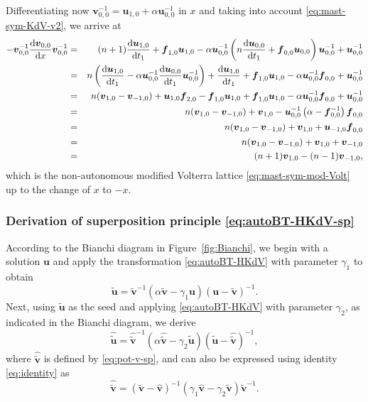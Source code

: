 \documentclass[dvips,10pt]{article}
\newcommand{\bs}{\boldsymbol}
\newcommand{\bsu}{ {\bs{u}}}
\newcommand{\bsf}{ {\bs{f}}}
\newcommand{\bsv}{ {\bs{v}}}
\theoremstyle{remark} %
\begin{document}
	Differentiating now $\bsv_{0,0}^{-1} = \bsu_{1,0} + \alpha \bsu_{0,0}^{-1}$ in $x$ and taking into account \eqref{eq:mast-sym-KdV-v2}, we arrive at
	\begin{eqnarray*}
		-\bsv_{0,0}^{-1} \frac{{\rm{d}} \bsv_{0,0}}{{\rm{d}} x} \bsv_{0,0}^{-1} &=& (n+1)  \frac{{\rm{d}} {\bs{u}}_{1,0}}{{\rm{d}} t_1} + \bsf_{1,0} \bsu_{1,0}  - \alpha \bsu_{0,0}^{-1} \left( n \frac{{\rm{d}} {\bs{u}}_{0,0}}{{\rm{d}} t_1} + \bsf_{0,0} \bsu_{0,0} \right)\bsu_{0,0}^{-1} + \bsu_{0,0}^{-1}   \\
		&=& n \left( \frac{{\rm{d}} {\bs{u}}_{1,0}}{{\rm{d}} t_1} - \alpha \bsu_{0,0}^{-1} \frac{{\rm{d}} {\bs{u}}_{0,0}}{{\rm{d}} t_1} \bsu_{0,0}^{-1} \right) + \frac{{\rm{d}} {\bs{u}}_{1,0}}{{\rm{d}} t_1} + \bsf_{1,0} \bsu_{1,0} - \alpha \bsu_{0,0}^{-1} \bsf_{0,0}  + \bsu_{0,0}^{-1}   \\
		&=& n ( \bsv_{1,0} -  \bsv_{-1,0}) +  {\bs{u}}_{1,0} {\bs{f}}_{2,0} -{\bs{f}}_{1,0}  {\bs{u}}_{1,0}  + \bsf_{1,0} \bsu_{1,0} - \alpha \bsu_{0,0}^{-1} \bsf_{0,0}  + \bsu_{0,0}^{-1} \\
		&=&n ( \bsv_{1,0} -  \bsv_{-1,0}) +  {\bs{v}}_{1,0}  - \bsu_{0,0}^{-1} \left( \alpha   - \bsf_{0,0}^{-1}\right) \bsf_{0,0}\\ 
		&=&n ( \bsv_{1,0} -  \bsv_{-1,0}) +  {\bs{v}}_{1,0} + \bsu_{-1,0} \bsf_{0,0}\\ 
		&=&n ( \bsv_{1,0} -  \bsv_{-1,0}) +  {\bs{v}}_{1,0}  + \bsv_{-1,0}\\ 
		&=& (n+1) \bsv_{1,0}  - (n-1) \bsv_{-1,0},
	\end{eqnarray*}
	which is the non-autonomous modified Volterra lattice \eqref{eq:mast-sym-mod-Volt} up to the change of $x$ to $-x$.
	
	\subsubsection*{Derivation of superposition principle \eqref{eq:autoBT-HKdV-sp}}
	
	According to the Bianchi diagram in Figure~\ref{fig:Bianchi}, we begin with a solution $\bsu$ and apply the transformation \eqref{eq:autoBT-HKdV} with parameter $\gamma_1$ to obtain
	\begin{equation} \label{eq:proof-sp-3}
		\tilde{\bsu} = \tilde{\bsv}^{-1} \left( \alpha \tilde{\bsv} - \gamma_1 \bsu \right) \left(\bsu - \tilde{\bsv}\right)^{-1}.
	\end{equation}
	Next, using $\tilde{\bsu}$ as the seed and applying \eqref{eq:autoBT-HKdV} with parameter $\gamma_2$, as indicated in the Bianchi diagram, we derive
	\begin{equation} \label{eq:proof-sp-1}
		\hat{\tilde{\bsu}} =  \hat{\tilde{\bsv}}^{-1} \left( \alpha \hat{\tilde{\bsv}} - \gamma_2 \tilde{\bsu} \right) \left(\tilde{\bsu} - \hat{\tilde{\bsv}} \right)^{-1},
	\end{equation}
	where $\hat{\tilde{\bsv}}$ is defined by \eqref{eq:pot-v-sp}, and can also be expressed using identity \eqref{eq:identity} as
	\begin{equation} \label{eq:proof-sp-2}
	\hat{\tilde{\bsv}} = \left(\tilde{\bsv} -  \hat{\bsv} \right)^{-1}\left(\gamma_1 \hat{\bsv} -  \gamma_2 \tilde{\bsv} \right) \tilde{\bsv}^{-1}.
	\end{equation}
	
\end{document}
